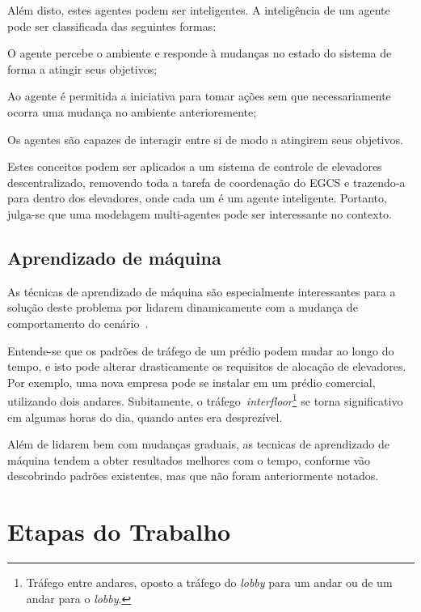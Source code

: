 Além disto, estes agentes podem ser inteligentes. A inteligência de um agente pode ser classificada das seguintes formas:

\begin{description}[leftmargin=!,labelwidth=\widthof{\bfseries Pró-ativa}]
  \item[Reativa]    O agente percebe o ambiente e responde à mudanças no estado
                    do sistema de forma a atingir seus objetivos;
  \item[Pró-ativa]  Ao agente é permitida a iniciativa para tomar ações sem que
                    necessariamente ocorra uma mudança no ambiente
                    anterioremente;
  \item[Social]     Os agentes são capazes de interagir entre si de modo a
                    atingirem seus objetivos.
\end{description}

Estes conceitos podem ser aplicados a um sistema de controle de elevadores
descentralizado, removendo toda a tarefa de coordenação do EGCS e trazendo-a
para dentro dos elevadores, onde cada um é um agente inteligente. Portanto,
julga-se que uma modelagem multi-agentes pode ser interessante no contexto.

\subsection{\label{section:machinelearning}Aprendizado de máquina}

As técnicas de aprendizado de máquina são especialmente interessantes para a
solução deste problema por lidarem dinamicamente com a mudança de comportamento
do cenário~\cite{Russell:2003:AIM:773294}.

Entende-se que os padrões de tráfego de um prédio podem mudar ao longo do tempo,
e isto pode alterar drasticamente os requisitos de alocação de elevadores. Por
exemplo, uma nova empresa pode se instalar em um prédio comercial, utilizando
dois andares. Subitamente, o tráfego~\textit{interfloor}\footnote{Tráfego entre
andares, oposto a tráfego do \textit{lobby} para um andar ou de um andar para
o \textit{lobby}.} se torna significativo em algumas horas do dia, quando antes
era desprezível.

Além de lidarem bem com mudanças graduais, as tecnicas de aprendizado de máquina
tendem a obter resultados melhores com o tempo, conforme vão descobrindo padrões
existentes, mas que não foram anteriormente notados.

\section{\label{chap:stages}Etapas do Trabalho}

